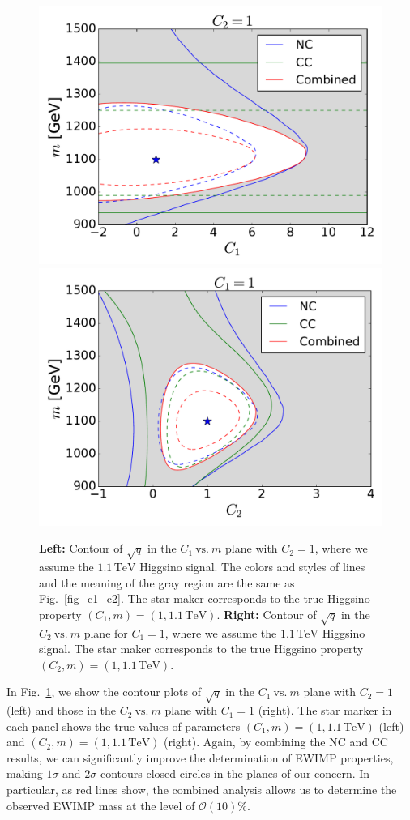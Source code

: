 \documentclass[12pt,twoside,book]{article}
\begin{document}
\begin{figure}[t]
 \centering
 \includegraphics[width=0.48\linewidth]{C1_vs_mass_Higgsino.pdf}
 \includegraphics[width=0.48\linewidth]{C2_vs_mass_Higgsino.pdf}
 \caption{\textbf{Left:} Contour of $\sqrt{q}$ in the
 $C_1~\mathrm{vs.}~m$ plane with $C_2 = 1$,
 where we assume the $1.1\,\mathrm{TeV}$ Higgsino signal.
 The colors and
 styles of lines and the meaning of the gray region are the same as
 Fig.~\ref{fig_c1_c2}.  The star maker corresponds to the true Higgsino
 property $(C_1, m) = (1, 1.1\,\mathrm{TeV})$. \textbf{Right:} Contour
 of $\sqrt{q}$ in the $C_2~\mathrm{vs.}~m$ plane for $C_1 = 1$,
 where we assume the $1.1\,\mathrm{TeV}$ Higgsino signal.
The star maker corresponds to the true Higgsino property $(C_2, m) = (1,
1.1\,\mathrm{TeV})$.
 }
 \label{fig_c1_m}
\end{figure}

In Fig.~\ref{fig_c1_m}, we show the contour
plots of $\sqrt{q}$ in the $C_1~\mathrm{vs.}~m$ plane with $C_2=1$ (left)
and those in the $C_2~\mathrm{vs.}~m$ plane with $C_1=1$ (right).
The star marker in each panel shows the true values of
parameters $(C_1, m) = (1, 1.1\,\mathrm{TeV})$ (left) and $(C_2, m) =
(1, 1.1\,\mathrm{TeV})$ (right).  Again, by combining the NC and CC
results, we can significantly improve the determination of EWIMP
properties, making $1\sigma$ and $2\sigma$ contours closed circles in
the planes of our concern.  In particular, as red lines show, the
combined analysis allows us to determine the observed EWIMP mass at the
level of $\mathcal{O}(10)\%$.
\end{document}

